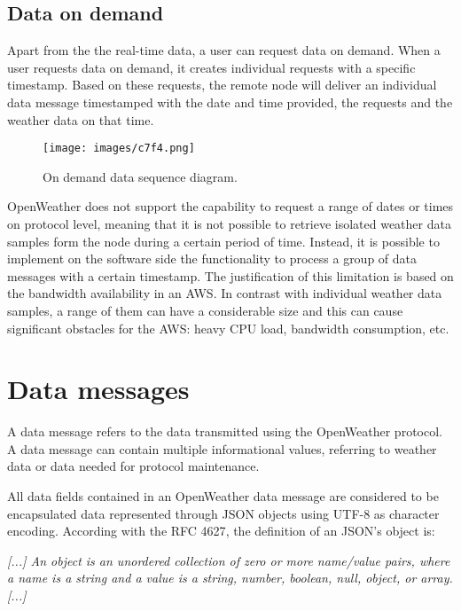 \subsection{Data on demand}

Apart from the the real-time data, a user can request data on demand. When a user requests data on demand, it creates individual requests with a specific timestamp. Based on these requests, the remote node will deliver an individual data message timestamped with the date and time provided, the requests and the weather data on that time. 

\begin{figure}[H]
\centerline{\texttt{[image: images/c7f4.png]}}
\caption{On demand data sequence diagram.}
\end{figure}
 
OpenWeather does not support the capability to request a range of dates or times on protocol level, meaning that it is not possible to retrieve isolated weather data samples form the node during a certain period of time. Instead, it is possible to implement on the software side the functionality to process a group of data messages with a certain timestamp. The justification of this limitation is based on the bandwidth availability in an \gls{AWS}. In contrast with individual weather data samples, a range of them can have a considerable size and this can cause significant obstacles for the \gls{AWS}: heavy \gls{CPU} load, bandwidth consumption, etc.


\section{Data messages}

A data message refers to the data transmitted using the OpenWeather protocol. A data message can contain multiple informational values, referring to weather data or data needed for protocol maintenance.

All data fields contained in an OpenWeather data message are considered to be encapsulated data represented through \gls{JSON} objects using \gls{UTF}-8\cite{UTF}\cite{rfc3629} as character encoding. According with the \gls{RFC} 4627\cite{rfc4627}, the definition of an \gls{JSON}'s object is:

  \emph{[...] An object is an unordered collection of zero or more name/value
   pairs, where a name is a string and a value is a string, number,
   boolean, null, object, or array.[...]}
 
